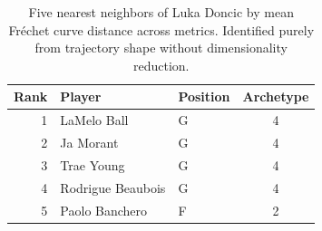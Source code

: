 \begin{table}[htbp]
  \centering\small
  \begin{tabular}{rllc}
    \toprule
    Rank & Player & Position & Archetype \\
    \midrule
    1 & LaMelo Ball & G & 4 \\
    2 & Ja Morant & G & 4 \\
    3 & Trae Young & G & 4 \\
    4 & Rodrigue Beaubois & G & 4 \\
    5 & Paolo Banchero & F & 2 \\
    \bottomrule
  \end{tabular}
  \caption{Five nearest neighbors of Luka Doncic by mean Fr\'{e}chet curve distance across metrics. Identified purely from trajectory shape without dimensionality reduction.}
  \label{tab:Luka_Doncic_frechet_curve_neighbors}
\end{table}

